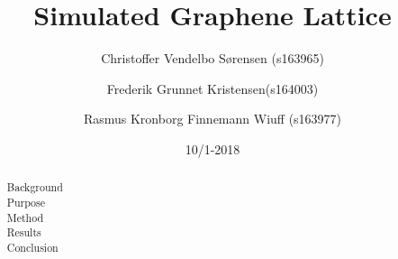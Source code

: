\begin{abstract}
  \begin{description}
    \item[Background]
    \item[Purpose]
    \item[Method]
    \item[Results]
    \item[Conclusion]
  \end{description}
\end{abstract}

\title{Simulated Graphene Lattice}
\date{10/1-2018}
\author{Christoffer Vendelbo Sørensen (s163965)}
\author{Frederik Grunnet Kristensen(s164003)}
\author{Rasmus Kronborg Finnemann Wiuff (s163977)}



\maketitle
